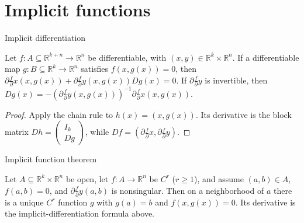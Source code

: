 \section{Implicit functions}

\begin{theorem}{Implicit differentiation}

Let \(f:A \subseteq \mathbb{R}^{k + n}\rightarrow\mathbb{R}^{n}\) be differentiable, with \(\left( {x,y} \right) \in \mathbb{R}^{k} \times \mathbb{R}^{n}\). If a differentiable map \(g:B \subseteq \mathbb{R}^{k}\rightarrow\mathbb{R}^{n}\) satisfies \(f\left( {x,g(x)} \right) = 0\), then \(\partial\frac{f}{\partial}x\left( {x,g(x)} \right) + \partial\frac{f}{\partial}y\left( {x,g(x)} \right)Dg(x) = 0\). If \(\partial\frac{f}{\partial}y\) is invertible, then \(Dg(x) = - \left( {\partial\frac{f}{\partial}y\left( {x,g(x)} \right)} \right)^{- 1}\partial\frac{f}{\partial}x\left( {x,g(x)} \right)\).

\end{theorem}

\begin{proof}

Apply the chain rule to \(h(x) = \left( {x,g(x)} \right)\). Its derivative is the block matrix \(Dh = \begin{pmatrix}
I_{k} \\
{Dg}
\end{pmatrix}\), while \(Df = \left( {\partial\frac{f}{\partial}x,\partial\frac{f}{\partial}y} \right)\).

\end{proof}

\begin{theorem}{Implicit function theorem}

Let \(A \subseteq \mathbb{R}^{k} \times \mathbb{R}^{n}\) be open, let \(f:A\rightarrow\mathbb{R}^{n}\) be \(C^{r}\) (\(r \geq 1\)), and assume \(\left( {a,b} \right) \in A\), \(f\left( {a,b} \right) = 0\), and \(\partial\frac{f}{\partial}y\left( {a,b} \right)\) is nonsingular. Then on a neighborhood of \(a\) there is a unique \(C^{r}\) function \(g\) with \(g(a) = b\) and \(f\left( {x,g(x)} \right) = 0\). Its derivative is the implicit-differentiation formula above.

\end{theorem}

